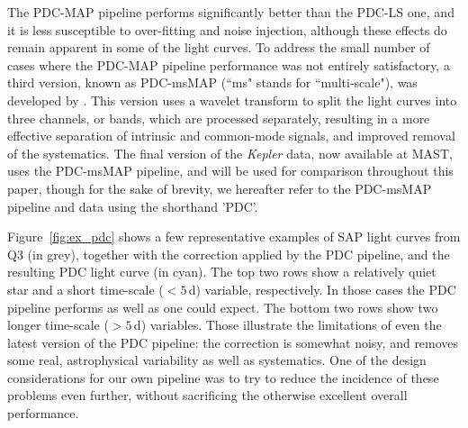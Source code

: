 \documentclass[useAMS,usenatbib]{mn2e}
\begin{document}
The PDC-MAP pipeline performs significantly better than the PDC-LS one, and it is
less susceptible to over-fitting and noise injection, although these
effects do remain apparent in some of the light
curves. To address the small number of cases where the PDC-MAP pipeline performance was not entirely satisfactory, a third version, known as PDC-msMAP (``ms" stands for ``multi-scale"), was developed by \citet{stu+14}. This version uses a wavelet transform to split the light curves into three channels, or bands, which are processed separately, resulting in a more effective separation of intrinsic and common-mode
signals, and improved removal of the systematics. The final version of the \emph{Kepler} data, now available at MAST, uses the PDC-msMAP pipeline, and will be used for comparison throughout this paper, though for the sake of brevity, we hereafter refer to the PDC-msMAP pipeline and data using the shorthand 'PDC'.


Figure~\ref{fig:ex_pdc} shows a few representative
examples of SAP light curves from Q3 (in grey), together with the correction applied by the PDC pipeline, and the resulting PDC light curve (in cyan). The top two rows show a relatively quiet star and a short time-scale ($<5$\,d) variable, respectively. In those cases the PDC pipeline performs as well as one could expect. The bottom two rows show two longer time-scale ($>5$\,d) variables. Those illustrate the limitations of even the latest version of the PDC pipeline: the correction is somewhat noisy, and removes some real, astrophysical variability as well as systematics. One of the design considerations for our own pipeline was to try to reduce the incidence of these problems even further, without sacrificing the otherwise excellent overall performance.
\end{document}
